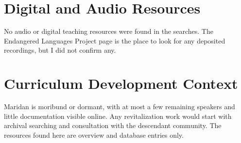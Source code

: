 \documentclass[12pt]{article}
\begin{document}
\section{Digital and Audio Resources}
No audio or digital teaching resources were found in the searches. The Endangered Languages Project page is the place to look for any deposited recordings, but I did not confirm any.

\section{Curriculum Development Context}
Maridan is moribund or dormant, with at most a few remaining speakers and little documentation visible online. Any revitalization work would start with archival searching and consultation with the descendant community. The resources found here are overview and database entries only.
\end{document}
